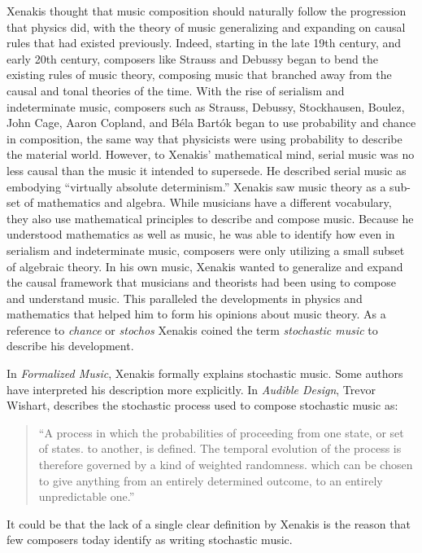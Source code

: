 Xenakis thought that music composition should naturally follow
the progression that physics did, with the theory of music
generalizing and expanding on causal rules that had existed
previously. Indeed, starting in the late 19th century, and early 20th
century, composers like Strauss and Debussy began to bend the existing
rules of music theory, composing music that branched away from the
causal and tonal theories of the time. With the rise of
serialism
and indeterminate music, composers such as Strauss, Debussy,
Stockhausen, Boulez, John Cage, Aaron Copland, and B\'{e}la Bart\'{o}k
began to use probability and chance in composition, the same way that
physicists were using probability to describe the material
world. However, to Xenakis' mathematical mind, serial music was no
less causal than the music it intended to supersede. He described
serial music as embodying ``virtually absolute
determinism.''\cite{xenakis1992formalized} Xenakis saw music theory as
a sub-set of mathematics and algebra. While musicians have a different
vocabulary, they also use mathematical principles to describe and
compose music. Because he understood mathematics as well as music, he
was able to identify how even in serialism and indeterminate music,
composers were only utilizing a small subset of algebraic theory. In
his own music, Xenakis wanted to generalize and expand the causal
framework that musicians and theorists had been using to compose and
understand music. This paralleled the developments in physics and
mathematics that helped him to form his opinions about music theory.
As a reference to \emph{chance} or \emph{stochos} Xenakis coined the
term \emph{stochastic music} to describe his development.

In \textit{Formalized Music}, Xenakis formally explains stochastic
music. Some authors have interpreted his description more
explicitly. In \textit{Audible Design}, Trevor Wishart, describes the
stochastic process used to compose stochastic music as:
\begin{quotation}
  ``A process in which the probabilities of proceeding from one state,
  or set of states. to another, is defined. The temporal evolution of
  the process is therefore governed by a kind of weighted
  randomness. which can be chosen to give anything from an entirely
  determined outcome, to an entirely unpredictable
  one.''\cite{Wishart1994}
\end{quotation}
It could be that the lack of a single clear definition by Xenakis is
the reason that few composers today identify as writing stochastic
music.

